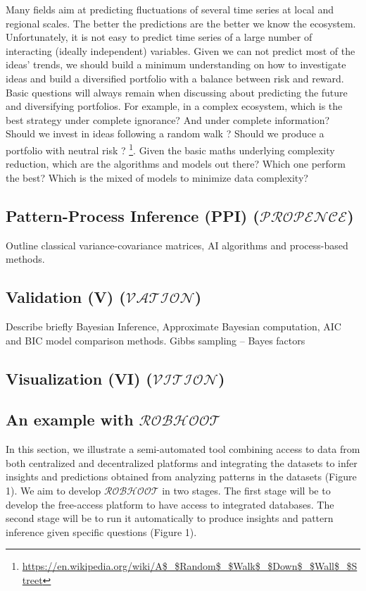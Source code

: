 \documentclass[english,12pt]{article}
\begin{document}
Many fields aim at predicting fluctuations of several time series at
local and regional scales. The better the predictions are the better
we know the ecosystem. Unfortunately, it is not easy to predict time
series of a large number of interacting (ideally independent)
variables. Given we can not predict most of the ideas' trends, we
should build a minimum understanding on how to investigate ideas and
build a diversified portfolio with a balance between risk and
reward. Basic questions will always remain when discussing about
predicting the future and diversifying portfolios. For example, in a
complex ecosystem, which is the best strategy under complete
ignorance? And under complete information?  Should we invest in ideas
following a random walk ? Should we produce a
portfolio with neutral risk ?
\footnote{\url{https://en.wikipedia.org/wiki/A$_$Random$_$Walk$_$Down$_$Wall$_$Street}}. Given
the basic maths underlying complexity reduction, which are the
algorithms and models out there? Which one perform the best? Which is
the mixed of models to minimize data complexity?
\\

\subsection{Pattern-Process Inference (PPI) ($\mathcal{PROPENCE}$)}

Outline classical variance-covariance matrices, AI
algorithms and process-based methods.

\subsection{Validation (V) ($\mathcal{VATION}$)}

Describe briefly Bayesian Inference, Approximate Bayesian computation,
AIC and BIC model comparison methods.  Gibbs sampling -- Bayes factors


\subsection{Visualization (VI) ($\mathcal{VITION}$)}


\subsection{An example with $\mathcal{ROBHOOT}$}
In this section, we illustrate a semi-automated tool combining access
to data from both centralized and decentralized platforms and
integrating the datasets to infer insights and predictions obtained
from analyzing patterns in the datasets (Figure 1). We aim to develop
$\mathcal{ROBHOOT}$ in two stages. The first stage will be to develop
the free-access platform to have access to integrated databases. The
second stage will be to run it automatically to produce insights and
pattern inference given specific questions (Figure 1).
\end{document}
